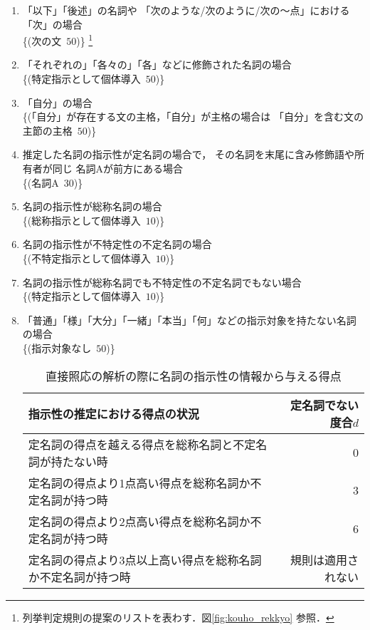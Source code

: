 {
\begin{enumerate}
\item 
  \label{enum:ika_kisoku}
  「以下」「後述」の名詞や
  「次のような/次のように/次の〜点」における「次」の場合\\
  \{(次の文 \,$50$)\}
  \footnote{列挙判定規則の提案のリストを表わす．図\ref{fig:kouho_rekkyo} 参照．}

\item 
  「それぞれの」「各々の」「各」などに修飾された名詞の場合\\
  \{(特定指示として個体導入 \,$50$)\}

\item 
  「自分」の場合\\
  \{(「自分」が存在する文の主格，「自分」が主格の場合は
  「自分」を含む文の主節の主格 \,$50$)\}

\item 
  \label{enum:定名詞探索}
  推定した名詞の指示性が定名詞の場合で，
  その名詞を末尾に含み修飾語や所有者が同じ
  名詞Aが前方にある場合
  \\ \{(名詞A 
  \,$30$)\}

\item 
  \label{enum:総称名詞導入}
  名詞の指示性が総称名詞の場合\\ 
  \{(総称指示として個体導入 \,$10$)\} 


\item 名詞の指示性が不特定性の不定名詞の場合\\ 
  \{(不特定指示として個体導入 \,$10$)\}

\item
  名詞の指示性が総称名詞でも不特定性の不定名詞でもない場合\\ 
  \{(特定指示として個体導入 \,$10$)\}

\item 
  「普通」「様」「大分」「一緒」「本当」「何」などの指示対象を持たない名詞の場合\\
  \{(指示対象なし \,$50$)\}

  \begin{table}[t]
    \begin{center}
      \caption{直接照応の解析の際に名詞の指示性の情報から与える得点}
    \label{tab:teimeishidenai_doai1}
  \begin{tabular}[h]{|l|r|}\hline
  指示性の推定における得点の状況                           & 定名詞でない度合$d$\\\hline
  定名詞の得点を越える得点を総称名詞と不定名詞が持たない時 & 0\\
  定名詞の得点より1点高い得点を総称名詞か不定名詞が持つ時  & $3$\\
  定名詞の得点より2点高い得点を総称名詞か不定名詞が持つ時  & $6$\\
  定名詞の得点より3点以上高い得点を総称名詞か不定名詞が持つ時 &  規則は適用されない \\\hline
  \end{tabular}
    \end{center}
  \end{table}


\end{enumerate}}
